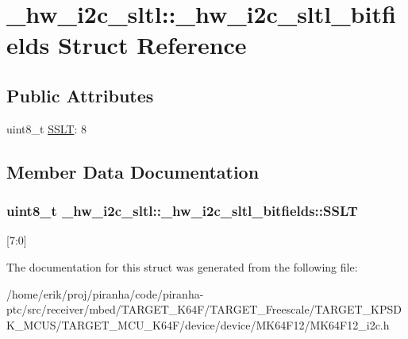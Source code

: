 \hypertarget{struct__hw__i2c__sltl_1_1__hw__i2c__sltl__bitfields}{}\section{\+\_\+hw\+\_\+i2c\+\_\+sltl\+:\+:\+\_\+hw\+\_\+i2c\+\_\+sltl\+\_\+bitfields Struct Reference}
\label{struct__hw__i2c__sltl_1_1__hw__i2c__sltl__bitfields}
\subsection*{Public Attributes}
\begin{DoxyCompactItemize}
\item 
uint8\+\_\+t \hyperlink{struct__hw__i2c__sltl_1_1__hw__i2c__sltl__bitfields_a9cd6c206e2c58ccefd03cb85b19cb760}{S\+S\+LT}\+: 8
\end{DoxyCompactItemize}


\subsection{Member Data Documentation}
\subsubsection[{\texorpdfstring{S\+S\+LT}{SSLT}}]{\setlength{\rightskip}{0pt plus 5cm}uint8\+\_\+t \+\_\+hw\+\_\+i2c\+\_\+sltl\+::\+\_\+hw\+\_\+i2c\+\_\+sltl\+\_\+bitfields\+::\+S\+S\+LT}\hypertarget{struct__hw__i2c__sltl_1_1__hw__i2c__sltl__bitfields_a9cd6c206e2c58ccefd03cb85b19cb760}{}\label{struct__hw__i2c__sltl_1_1__hw__i2c__sltl__bitfields_a9cd6c206e2c58ccefd03cb85b19cb760}
\mbox{[}7\+:0\mbox{]} 

The documentation for this struct was generated from the following file\+:\begin{DoxyCompactItemize}
\item 
/home/erik/proj/piranha/code/piranha-\/ptc/src/receiver/mbed/\+T\+A\+R\+G\+E\+T\+\_\+\+K64\+F/\+T\+A\+R\+G\+E\+T\+\_\+\+Freescale/\+T\+A\+R\+G\+E\+T\+\_\+\+K\+P\+S\+D\+K\+\_\+\+M\+C\+U\+S/\+T\+A\+R\+G\+E\+T\+\_\+\+M\+C\+U\+\_\+\+K64\+F/device/device/\+M\+K64\+F12/M\+K64\+F12\+\_\+i2c.\+h\end{DoxyCompactItemize}
